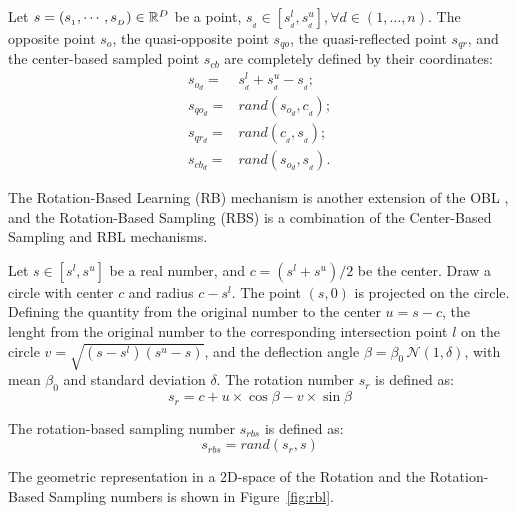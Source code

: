 \begin{definition}
\label{def:obl}
Let $s=(s_{_1}, \cdots, s_{_D}) \in \mathbb{R}^D$ be a point, $s_{_d} \in \left[s^l_{_d}, s^u_{_d}\right], \forall d \in \left(1, \dots, n\right)$. The opposite point $s_o$, the quasi-opposite point $s_{qo}$, the quasi-reflected point $s_{qr}$, and the center-based sampled point $s_{cb}$ are completely defined by their coordinates:
%
\begin{align}
s_{o_d} =& s^l_{_d} + s^u_{_d} - s_{_d};\\
s_{qo_d} =& rand(s_{o_d},c_{_d});\\
s_{qr_d} =& rand(c_{_d},s_{_d});\\
s_{cb_d} =& rand(s_{o_d},s_{_d}).
\end{align}

\end{definition}

The Rotation-Based Learning (RB) mechanism is another extension of the OBL \cite{Liu2014}, and the Rotation-Based Sampling (RBS) is a combination of the Center-Based Sampling and RBL mechanisms.

\begin{definition}
Let $s \in \left[s^l, s^u\right]$ be a real number, and $c = (s^l + s^u) / 2$ be the center. Draw a circle with center $c$ and radius $c-s^l$. The point $(s, 0)$ is projected on the circle. Defining the quantity from the original number to the center $u = s - c$, the lenght from the original number to the corresponding intersection point $l$ on the circle $v = \sqrt{ \left(s - s^l \right)\left( s^u - s \right)}$, and the deflection angle $\beta = \beta_0 \, \mathcal{N}(1, \delta)$, with mean $\beta_0$ and standard deviation $\delta$. The rotation number $s_r$ is defined as:
%
\begin{equation}
s_{r} = c + u \times \cos \beta - v \times \sin \beta
\end{equation}

\end{definition}

\begin{definition}
The rotation-based sampling number $s_{rbs}$ is defined as:
\begin{equation}
s_{rbs} = rand(s_r,s)
\end{equation}

\end{definition}

The geometric representation in a 2D-space of the Rotation and the Rotation-Based Sampling numbers is shown in Figure~\ref{fig:rbl}.

